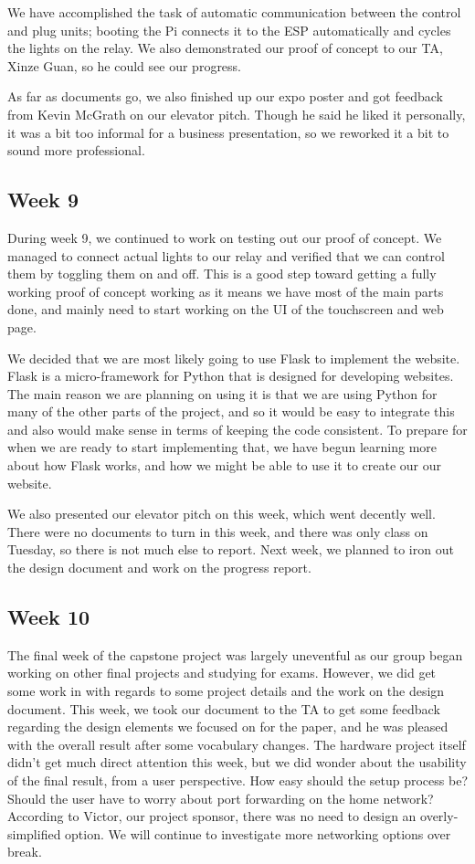 \documentclass[letterpaper,10pt]{article}
\begin{document}
We have accomplished the task of automatic communication between the control
and plug units; booting the Pi connects it to the ESP automatically and cycles
the lights on the relay.  We also demonstrated our proof of concept to our TA,
Xinze Guan, so he could see our progress.

As far as documents go, we also finished up our expo poster and got feedback
from Kevin McGrath on our elevator pitch.  Though he said he liked it
personally, it was a bit too informal for a business presentation, so we
reworked it a bit to sound more professional.

\subsection{Week 9}
 
During week 9, we continued to work on testing out our proof of concept. We
managed to connect actual lights to our relay and verified that we can control
them by toggling them on and off. This is a good step toward getting a fully
working proof of concept working as it means we have most of the main parts
done, and mainly need to start working on the UI of the touchscreen and web
page.

We decided that we are most likely going to use Flask to implement the website.
Flask is a micro-framework for Python that is designed for developing websites.
The main reason we are planning on using it is that we are using Python for
many of the other parts of the project, and so it would be easy to integrate
this and also would make sense in terms of keeping the code consistent. To
prepare for when we are ready to start implementing that, we have begun
learning more about how Flask works, and how we might be able to use it to
create our our website.

We also presented our elevator pitch on this week, which went decently well.
There were no documents to turn in this week, and there was only class on
Tuesday, so there is not much else to report. Next week, we planned to iron out
the design document and work on the progress report. 

\subsection{Week 10}

The final week of the capstone project was largely uneventful as our group
began working on other final projects and studying for exams. However, we did
get some work in with regards to some project details and the work on the
design document.  This week, we took our document to the TA to get some
feedback regarding the design elements we focused on for the paper, and he was
pleased with the overall result after some vocabulary changes.  The hardware
project itself didn't get much direct attention this week, but we did wonder
about the usability of the final result, from a user perspective.  How easy
should the setup process be? Should the user have to worry about port
forwarding on the home network? According to Victor, our project sponsor, there
was no need to design an overly-simplified option. We will continue to
investigate more networking options over break.
\end{document}
